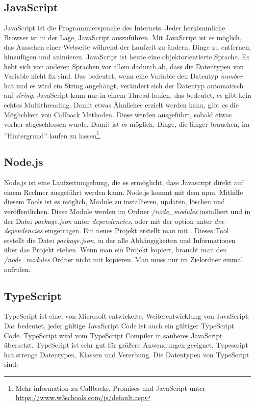 \subsection{JavaScript}
\label{sec:vor-js}
JavaScript ist die Programmiersprache des Internets. Jeder herkömmliche Browser ist in der Lage, JavaScript auszuführen. Mit JavaScript ist es möglich, das Aussehen einer Webseite während der Laufzeit zu ändern, Dinge zu entfernen, hinzufügen und animieren. JavaScript ist heute eine objektorientierte Sprache. Es hebt sich von anderen Sprachen vor allem dadurch ab, dass die Datentypen von Variable nicht fix sind. Das bedeutet, wenn eine Variable den Datentyp \textit{number} hat und es wird ein String angehängt, verändert sich der Datentyp automatisch auf \textit{string}. JavaScript kann nur in einem Thread laufen, das bedeutet, es gibt kein echtes Multithreading. Damit etwas Ähnliches erzielt werden kann, gibt es die Möglichkeit von Callback Methoden. Diese werden ausgeführt, sobald etwas vorher abgeschlossen wurde. Damit ist es möglich, Dinge, die länger brauchen, im ''Hintergrund'' laufen zu lassen\footnote{Mehr information zu Callbacks, Promises und JavaScript unter \url{https://www.w3schools.com/js/default.asp}}.

\subsection{Node.js}
\label{sec:vor-node}
Node.js ist eine Laufzeitumgebung, die es ermöglicht, dass Javascript direkt auf einem Rechner ausgeführt werden kann. Node.js kommt mit dem \ac{npm}. Mithilfe diesem Tools ist es möglich, Module zu installieren, updaten, löschen und veröffentlichen. Diese Module werden im Ordner \textit{/node\_modules} installiert und in der Datei \textit{package.json} unter \textit{dependencies}, oder mit der option  unter \textit{dev-dependencies} eingetragen. Ein neues Projekt erstellt man mit . Dieses Tool erstellt die Datei \textit{package.json}, in der alle Abhängigkeiten und Informationen über das Projekt stehen. Wenn man ein Projekt kopiert, braucht man den \textit{/node\_modules} Ordner nicht mit kopieren. Man muss nur im Zielordner einmal  aufrufen.

\subsection{TypeScript}
\label{sec:vor-ts}
TypeScript ist eine, von Microsoft entwickelte, Weiterentwicklung von JavaScript. Das bedeutet, jeder gültige JavaScript Code ist auch ein gültiger TypeScript Code. TypeScript wird vom TypeScript Compiler in sauberes JavaScript übersetzt. TypeScript ist sehr gut für größere Anwendungen geeignet. Typescript hat strenge Datentypen, Klassen und Vererbung. Die Datentypen von TypeScript sind:

